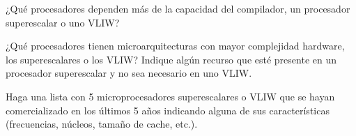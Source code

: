 \begin{cuestion}
    ¿Qué procesadores dependen más de la capacidad del compilador, un procesador superescalar o uno VLIW?
\end{cuestion}

\begin{cuestion}
    ¿Qué procesadores tienen microarquitecturas con mayor complejidad hardware, los superescalares o los VLIW\@? Indique algún recurso que esté presente en un procesador superescalar y no sea necesario en uno VLIW.

    Haga una lista con 5 microprocesadores superescalares o VLIW que se hayan comercializado en los últimos 5 años indicando alguna de sus características (frecuencias, núcleos, tamaño de cache, etc.).
\end{cuestion}
